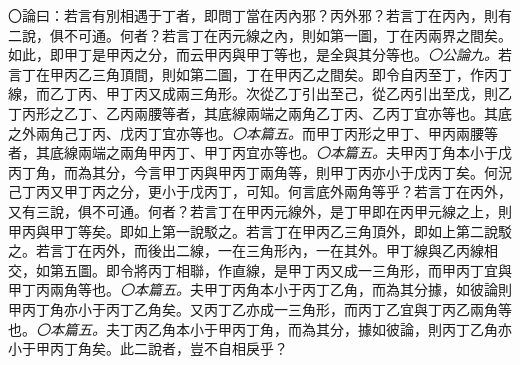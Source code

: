\documentclass[12pt,b5paper,landscape]{article}
\newcommand{\ccom}[1]{{\footnotesize \emph{〇#1}}}
\newcommand{\bcom}[1]{〇#1}
\begin{document}
\begin{multicols}{2}
\bcom{論曰：若言有別相遇于丁者，即問丁當在丙內邪？丙外邪？若言丁在丙內，則有二說，俱不可通。何者？若言丁在丙元線之內，則如第一圖，丁在丙兩界之間矣。如此，即甲丁是甲丙之分，而云甲丙與甲丁等也，是全與其分等也。\ccom{公論九。}若言丁在甲丙乙三角頂間，則如第二圖，丁在甲丙乙之間矣。即令自丙至丁，作丙丁線，而乙丁丙、甲丁丙又成兩三角形。次從乙丁引出至己，從乙丙引出至戊，則乙丁丙形之乙丁、乙丙兩腰等者，其底線兩端之兩角乙丁丙、乙丙丁宜亦等也。其底之外兩角己丁丙、戊丙丁宜亦等也。\ccom{本篇五。}而甲丁丙形之甲丁、甲丙兩腰等者，其底線兩端之兩角甲丙丁、甲丁丙宜亦等也。\ccom{本篇五。}夫甲丙丁角本小于戊丙丁角，而為其分，今言甲丁丙與甲丙丁兩角等，則甲丁丙亦小于戊丙丁矣。何況己丁丙又甲丁丙之分，更小于戊丙丁，可知。何言底外兩角等乎？若言丁在丙外，又有三說，俱不可通。何者？若言丁在甲丙元線外，是丁甲即在丙甲元線之上，則甲丙與甲丁等矣。即如上第一說駁之。若言丁在甲丙乙三角頂外，即如上第二說駁之。若言丁在丙外，而後出二線，一在三角形內，一在其外。甲丁線與乙丙線相交，如第五圖。即令將丙丁相聯，作直線，是甲丁丙又成一三角形，而甲丙丁宜與甲丁丙兩角等也。\ccom{本篇五。}夫甲丁丙角本小于丙丁乙角，而為其分據，如彼論則甲丙丁角亦小于丙丁乙角矣。又丙丁乙亦成一三角形，而丙丁乙宜與丁丙乙兩角等也。\ccom{本篇五。}夫丁丙乙角本小于甲丙丁角，而為其分，據如彼論，則丙丁乙角亦小于甲丙丁角矣。此二說者，豈不自相戾乎？}


\end{multicols}
\end{document}
